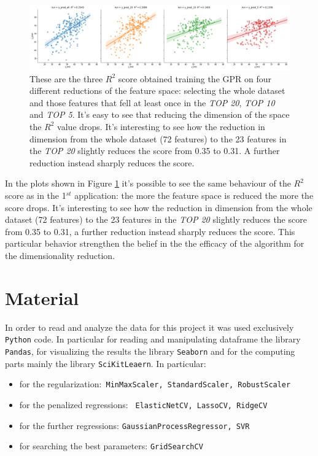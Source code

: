 \documentclass{article}
\begin{document}
\begin{figure}[ht]
	\centerline{\includegraphics[width=1.3\textwidth]{four_graphs}}
	\caption{These are the three $R^2$ score obtained training the GPR on four different reductions of the feature space: selecting the whole dataset and those features that fell at least once in the \emph{TOP 20}, \emph{TOP 10} and \emph{TOP 5}. It's easy to see that reducing the dimension of the space the $R^2$ value drops. It's interesting to see how the reduction in dimension from the whole dataset (72 features) to the 23 features in the \emph{TOP 20} slightly reduces the score from 0.35 to 0.31. A further reduction instead sharply reduces the score.}
	\label{fig:Cardio_graphs}
	\centering
\end{figure}

In the plots shown in Figure \ref{fig:Cardio_graphs} it's possible to see the same behaviour of the $R^2$ score as in the 1$^{st}$ application: the more the feature space is reduced the more the score drops. It's interesting to see how the reduction in dimension from the whole dataset (72 features) to the 23 features in the \emph{TOP 20} slightly reduces the score from 0.35 to 0.31, a further reduction instead sharply reduces the score. This particular behavior strengthen the belief in the the efficacy of the algorithm for the dimensionality reduction.


\section*{Material}
In order to read and analyze the data for this project it was used exclusively \texttt{Python} code. In particular for reading and manipulating dataframe the library \texttt{Pandas}, for visualizing the results the library \texttt{Seaborn} and for the computing parts mainly the library \texttt{SciKitLeaern}.
In particular:

\begin{itemize}
	\item for the regularization:\texttt{ MinMaxScaler, StandardScaler, RobustScaler}
	\item for the penalized regressions: \texttt{ ElasticNetCV, LassoCV, RidgeCV}
	\item for the further regressions: \texttt{GaussianProcessRegressor, SVR}
	\item for searching the best parameters: \texttt{GridSearchCV}
\end{itemize}
\end{document}
